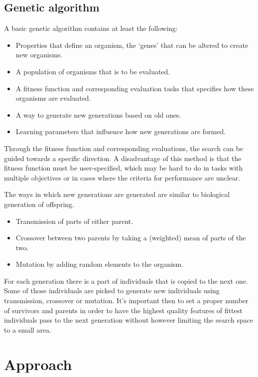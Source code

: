 \documentclass{article}
\begin{document}
\subsection{Genetic algorithm}
A basic genetic algorithm contains at least the following:

\begin{itemize} 
\item Properties that define an organism, the `genes' that can be altered to create new organisms.
\item A population of organisms that is to be evaluated. 
\item A fitness function and corresponding evaluation tasks that specifies how these organisms are evaluated.
\item A way to generate new generations based on old ones. 
\item Learning parameters that influence how new generations are formed. 
\end{itemize}

Through the fitness function and corresponding evaluations, the search can be guided towards a specific direction. A disadvantage of this method is that the fitness function must be user-specified, which may be hard to do in tasks with multiple objectives or in cases where the criteria for performance are unclear. 

The ways in which new generations are generated are similar to biological generation of offspring.  
\begin{itemize} 
\item Transmission of parts of either parent.
\item Crossover between two parents by taking a (weighted) mean of parts of the two.
\item Mutation by adding random elements to the organism.
\end{itemize}


For each generation there is a part of individuals that is copied to the next one. Some of those individuals are picked to generate new individuals using transmission, crossover or mutation. It's important then to set a proper number of survivors and parents in order to have the highest quality features of fittest individuals pass to the next generation without however limiting the search space to a small area. 




\section{Approach}
\end{document}
